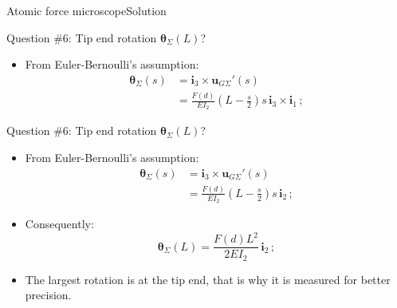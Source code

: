 \documentclass{beamer}
\newcommand{\uj}{u}
\newcommand{\uv}{{\boldsymbol\uj}}
\renewcommand{\ij}{i}
\newcommand{\iv}{{\boldsymbol\ij}}
\newcommand*{\drotj}{\theta}
\newcommand*{\drot}{{\boldsymbol\drotj}}
\begin{document}
\begin{frame}{Atomic force microscope}{Solution}

\begin{overprint}

\vskip-20pt
\begin{exampleblock}{Question \#6: Tip end rotation $\drot_\Sigma(L)$?}
\begin{itemize}
\item From Euler-Bernoulli's assumption:
\begin{displaymath}
\begin{split}
\drot_\Sigma(s) &=\iv_3\times\uv_{G\Sigma}'(s) \\
&=\frac{F(d)}{EI_2}\left(L-\frac{s}{2}\right)s\,\iv_3\times\iv_1\,;
\end{split}
\end{displaymath}
\end{itemize}
\end{exampleblock}

\vskip-20pt
\begin{exampleblock}{Question \#6: Tip end rotation $\drot_\Sigma(L)$?}
\begin{itemize}
\item From Euler-Bernoulli's assumption:
\begin{displaymath}
\begin{split}
\drot_\Sigma(s) &=\iv_3\times\uv_{G\Sigma}'(s) \\
&=\frac{F(d)}{EI_2}\left(L-\frac{s}{2}\right)s\,\iv_2\,;
\end{split}
\end{displaymath}
\item Consequently:
\begin{displaymath}
\drot_\Sigma(L)=\frac{F(d)L^2}{2EI_2}\,\iv_2\,;
\end{displaymath}
\item The largest rotation is at the tip end, that is why it is measured for better precision.
\end{itemize}
\end{exampleblock}

\end{overprint}

\end{frame}
\end{document}
